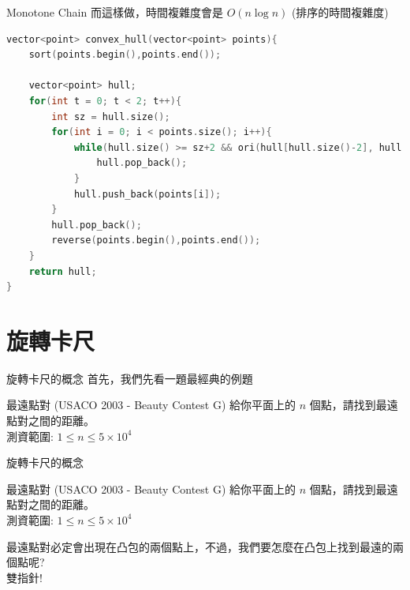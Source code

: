 \documentclass[aspectratio=169]{beamer}
\begin{document}
\begin{frame}[fragile]{Monotone Chain}
    而這樣做，時間複雜度會是 $O(n \log n)$ (排序的時間複雜度)
    \begin{lstlisting}[language=C++,basicstyle=\ttfamily\tiny]
vector<point> convex_hull(vector<point> points){
    sort(points.begin(),points.end());

    vector<point> hull;
    for(int t = 0; t < 2; t++){
        int sz = hull.size();
        for(int i = 0; i < points.size(); i++){
            while(hull.size() >= sz+2 && ori(hull[hull.size()-2], hull.back(), points[i]) <= 0){
                hull.pop_back();
            }
            hull.push_back(points[i]);
        }
        hull.pop_back();
        reverse(points.begin(),points.end());
    }
    return hull;
}
    \end{lstlisting}
\end{frame}

\section{旋轉卡尺}

\begin{frame}[fragile]{旋轉卡尺的概念}
    首先，我們先看一題最經典的例題
    \begin{block}{最遠點對 (USACO 2003 - Beauty Contest G)}
        給你平面上的 $n$ 個點，請找到最遠點對之間的距離。\\
        \vspace{5mm}
        測資範圍: $1 \le n \le 5 \times 10^4$
    \end{block}
\end{frame}

\begin{frame}[fragile]{旋轉卡尺的概念}
    \begin{block}{最遠點對 (USACO 2003 - Beauty Contest G)}
        給你平面上的 $n$ 個點，請找到最遠點對之間的距離。\\
        \vspace{5mm}
        測資範圍: $1 \le n \le 5 \times 10^4$
    \end{block}
    最遠點對必定會出現在凸包的兩個點上，不過，我們要怎麼在凸包上找到最遠的兩個點呢? \\
    \vspace{2.5mm}
    雙指針!
\end{frame}
\end{document}
